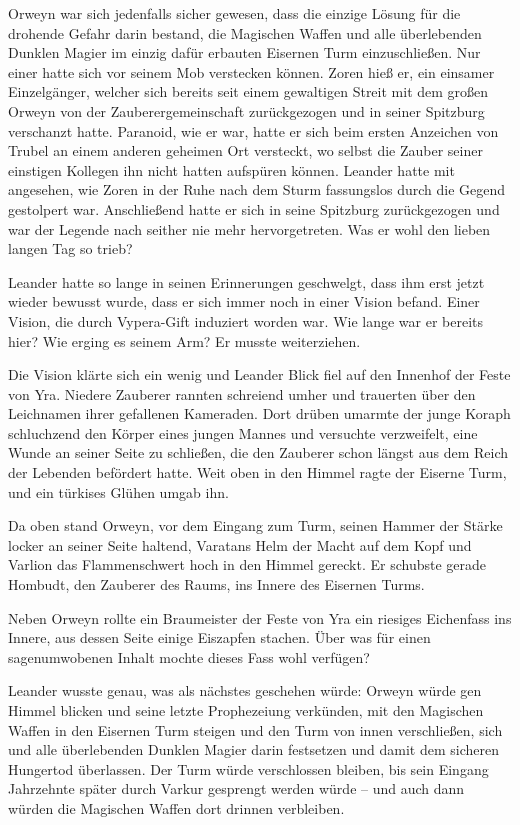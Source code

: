 \documentclass[10pt, a4paper, oneside]{book}
\begin{document}
Orweyn war sich jedenfalls sicher gewesen, dass die einzige Lösung für die drohende Gefahr darin bestand, die Magischen Waffen und alle überlebenden Dunklen Magier im einzig dafür erbauten Eisernen Turm einzuschließen. Nur einer hatte sich vor seinem Mob verstecken können. Zoren hieß er, ein einsamer Einzelgänger, welcher sich bereits seit einem gewaltigen Streit mit dem großen Orweyn von der Zauberergemeinschaft zurückgezogen und in seiner Spitzburg verschanzt hatte. Paranoid, wie er war, hatte er sich beim ersten Anzeichen von Trubel an einem anderen geheimen Ort versteckt, wo selbst die Zauber seiner einstigen Kollegen ihn nicht hatten aufspüren können. Leander hatte mit angesehen, wie Zoren in der Ruhe nach dem Sturm fassungslos durch die Gegend gestolpert war. Anschließend hatte er sich in seine Spitzburg zurückgezogen und war der Legende nach seither nie mehr hervorgetreten. Was er wohl den lieben langen Tag so trieb?

Leander hatte so lange in seinen Erinnerungen geschwelgt, dass ihm erst jetzt wieder bewusst wurde, dass er sich immer noch in einer Vision befand. Einer Vision, die durch Vypera-Gift induziert worden war. Wie lange war er bereits hier? Wie erging es seinem Arm? Er musste weiterziehen.

Die Vision klärte sich ein wenig und Leander Blick fiel auf den Innenhof der Feste von Yra. Niedere Zauberer rannten schreiend umher und trauerten über den Leichnamen ihrer gefallenen Kameraden. Dort drüben umarmte der junge Koraph schluchzend den Körper eines jungen Mannes und versuchte verzweifelt, eine Wunde an seiner Seite zu schließen, die den Zauberer schon längst aus dem Reich der Lebenden befördert hatte. Weit oben in den Himmel ragte der Eiserne Turm, und ein türkises Glühen umgab ihn.

Da oben stand Orweyn, vor dem Eingang zum Turm, seinen Hammer der Stärke locker an seiner Seite haltend, Varatans Helm der Macht auf dem Kopf und Varlion das Flammenschwert hoch in den Himmel gereckt. Er schubste gerade Hombudt, den Zauberer des Raums, ins Innere des Eisernen Turms.

Neben Orweyn rollte ein Braumeister der Feste von Yra ein riesiges Eichenfass ins Innere, aus dessen Seite einige Eiszapfen stachen. Über was für einen sagenumwobenen Inhalt mochte dieses Fass wohl verfügen?

Leander wusste genau, was als nächstes geschehen würde: Orweyn würde gen Himmel blicken und seine letzte Prophezeiung verkünden, mit den Magischen Waffen in den Eisernen Turm steigen und den Turm von innen verschließen, sich und alle überlebenden Dunklen Magier darin festsetzen und damit dem sicheren Hungertod überlassen. Der Turm würde verschlossen bleiben, bis sein Eingang Jahrzehnte später durch Varkur gesprengt werden würde – und auch dann würden die Magischen Waffen dort drinnen verbleiben.
\end{document}
